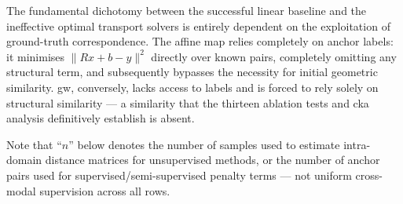 The fundamental dichotomy between the successful linear baseline and the ineffective optimal transport solvers is entirely dependent on the exploitation of ground-truth correspondence. The affine map relies completely on anchor labels: it minimises $\|Rx + b - y\|^2$ directly over known pairs, completely omitting any structural term, and subsequently bypasses the necessity for initial geometric similarity. \gls{gw}, conversely, lacks access to labels and is forced to rely solely on structural similarity --- a similarity that the thirteen ablation tests and \gls{cka} analysis definitively establish is absent.

Note that ``$n$'' below denotes the number of samples used to
estimate intra-domain distance matrices for unsupervised methods, or the
number of anchor pairs used for supervised/semi-supervised penalty terms
--- not uniform cross-modal supervision across all rows.

\begin{table}[H]
\centering
{}
\caption{Complete ranking of all tested alignment methods on PointNet
$\times$ CLIP. Final Top-5 order: \gls{cca}+Affine (35.7\%) $>$ \gls{rml} (27.2\%)
$>$ \gls{kcca} (15.8\%) $>$ \gls{fgw} (4.4\%) $>$ \gls{sgw} (3.2\%) $>$ random ($\approx$1\%).
Supervised methods consistently and substantially outperform all
unsupervised alternatives.
\gls{cca}+Affine result taken from Table~\ref{tab:linear_baseline_results}
(Chapter~\ref{ch:baseline}). \gls{kcca} and \gls{rml} results from
Chapter~\ref{ch:nonlinear}. All results: 500 query points, $k=50$,
averaged over 3 random seeds.}
\label{tab:final_ranking}
\end{table}

